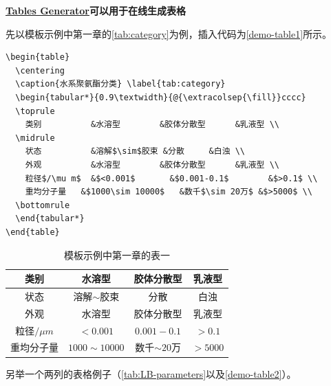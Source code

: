 \textbf{\href{https://www.tablesgenerator.com/}{Tables Generator}可以用于在线生成表格}

先以模板示例中第一章的\autoref{tab:category}为例，插入代码为\autoref{demo-table1}所示。

\begin{lstlisting}[language={[LaTeX]TeX}, caption={示例插表代码}, label=demo-table1]
\begin{table}
  \centering
  \caption{水系聚氨酯分类} \label{tab:category}
  \begin{tabular*}{0.9\textwidth}{@{\extracolsep{\fill}}cccc}
  \toprule
    类别			&水溶型		&胶体分散型		&乳液型 \\
  \midrule
    状态			&溶解$\sim$胶束	&分散		&白浊 \\
    外观			&水溶型		&胶体分散型		&乳液型 \\
    粒径$/\mu m$	&$<0.001$		&$0.001-0.1$		&$>0.1$ \\
    重均分子量	&$1000\sim 10000$	&数千$\sim 20万$ &$>5000$ \\
  \bottomrule
  \end{tabular*}
\end{table}
\end{lstlisting}

\begin{table}
  \centering
  \caption{模板示例中第一章的表一} \label{tab:category}
  \begin{tabular*}{0.9\textwidth}{@{\extracolsep{\fill}}cccc}
  \toprule
    类别			&水溶型		&胶体分散型		&乳液型 \\
  \midrule
    状态			&溶解$\sim$胶束	&分散		&白浊 \\
    外观			&水溶型		&胶体分散型		&乳液型 \\
    粒径$/\mu m$	&$<0.001$		&$0.001-0.1$		&$>0.1$ \\
    重均分子量	&$1000\sim 10000$	&数千$\sim 20$万 &$>5000$ \\
  \bottomrule
  \end{tabular*}
\end{table}

另举一个两列的表格例子（\autoref{tab:LB-parameters}以及\autoref{demo-table2}）。

